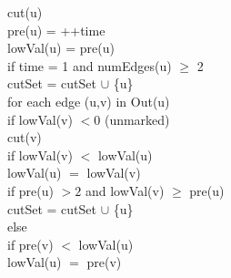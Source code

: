 \begin{enumerate}
\begin{enumerate}
\begin{algorithm}
        
        cut(u)\\
        \>pre(u) = ++time\\
        \>lowVal(u) = pre(u)\\
        \>if time = 1 and numEdges(u) $\geq$ 2\\
        \>\>cutSet = cutSet $\cup$ \{u\}\\
        \>for each edge (u,v) in Out(u)\\
        \>\>if lowVal(v) $< 0$ (unmarked)\\
        \>\>\>cut(v)\\
        \>\>\>if lowVal(v) $<$ lowVal(u)\\
        \>\>\>\>lowVal(u) $=$ lowVal(v)\\
        \>\>\>if pre(u) $>2$ and lowVal(v) $\geq$ pre(u)\\
        \>\>\>\>cutSet = cutSet $\cup$ \{u\}\\
        \>\>else\\
        \>\>\>if pre(v) $<$ lowVal(u)\\
        \>\>\>\>lowVal(u) $=$ pre(v)\\
      \end{algorithm}
      
  \end{enumerate}
\end{enumerate}
